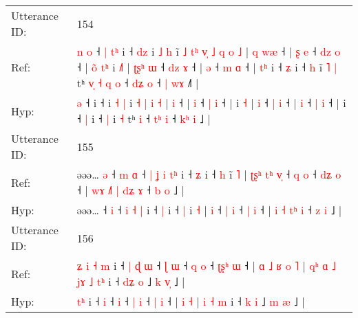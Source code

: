 \documentclass[10pt]{article}
\DeclareRobustCommand{\hl}[1]{{\textcolor{red}{#1}}}
\begin{document}
\begin{longtable}{ll}
 \\
\midrule
Utterance ID: & 154 \\
Ref: & \hl{n}\hl{ }\hl{o} ˧\hl{ }\hl{|}\hl{ }\hl{t}\hl{ʰ} i ˧\hl{ }\hl{d}\hl{z} i \hl{˩} \hl{h} i\hl{̃}\hl{ }\hl{˩}\hl{ }\hl{t}\hl{ʰ}\hl{ }\hl{v}\hl{̩} \hl{˩} \hl{q} \hl{o} \hl{˩} |\hl{ }\hl{q} \hl{w}\hl{æ} ˧ |\hl{ }\hl{ʂ} \hl{e} ˧ \hl{d}\hl{z} \hl{o} ˧ |\hl{ }\hl{o}\hl{̃}\hl{ }\hl{t}\hl{ʰ} i \hl{˩}\hl{˥} |\hl{ }\hl{ʈ}\hl{ʂ}\hl{ʰ} \hl{ɯ} ˧ \hl{d}\hl{z} \hl{ɤ} ˧ | \hl{ə} ˧ \hl{m} \hl{ɑ} ˧ |\hl{ }\hl{t}\hl{ʰ} i ˧ \hl{ʑ} i ˧ \hl{h} i\hl{̃}\hl{ }\hl{˥} \hl{|} tʰ\hl{ }\hl{v}\hl{̩}\hl{ }\hl{˧}\hl{ }\hl{q} \hl{o} ˧ \hl{d}\hl{ʑ} \hl{o} ˧ \hl{|}\hl{ }\hl{w}\hl{ɤ} ˩\hl{˥} |
 \\
Hyp: & \hl{}\hl{}\hl{ə} ˧\hl{}\hl{}\hl{}\hl{}\hl{} i ˧\hl{}\hl{}\hl{} i \hl{˧} \hl{|} i\hl{}\hl{}\hl{}\hl{}\hl{}\hl{}\hl{}\hl{}\hl{} \hl{˧} \hl{|} \hl{i} \hl{˧} |\hl{}\hl{} \hl{}\hl{i} ˧ |\hl{}\hl{} \hl{i} ˧ \hl{}\hl{|} \hl{i} ˧ |\hl{}\hl{}\hl{}\hl{}\hl{}\hl{} i \hl{}\hl{˧} |\hl{}\hl{}\hl{}\hl{} \hl{i} ˧ \hl{}\hl{|} \hl{i} ˧ | \hl{i} ˧ \hl{|} \hl{i} ˧ |\hl{}\hl{}\hl{} i ˧ \hl{|} i ˧ \hl{|} i\hl{}\hl{}\hl{} \hl{˧} tʰ\hl{}\hl{}\hl{}\hl{}\hl{}\hl{}\hl{} \hl{i} ˧ \hl{t}\hl{ʰ} \hl{i} ˧ \hl{k}\hl{ʰ}\hl{ }\hl{i} ˩\hl{} |
 \\
\midrule
Utterance ID: & 155 \\
Ref: & əəə…\hl{ }\hl{ə} ˧\hl{ }\hl{m} \hl{ɑ} ˧\hl{ }\hl{|} \hl{ʝ} \hl{i} \hl{t}\hl{ʰ} i ˧ \hl{ʑ} i ˧ \hl{h} i\hl{̃} \hl{˥} |\hl{ }\hl{ʈ}\hl{ʂ}\hl{ʰ}\hl{ }\hl{t}\hl{ʰ} \hl{v}\hl{̩} ˧ \hl{q} \hl{o} ˧ \hl{d}\hl{ʑ} \hl{o} ˧ |\hl{ }\hl{w}\hl{ɤ} \hl{˩}\hl{˥} \hl{|} \hl{d}\hl{ʑ} \hl{ɤ} ˧ \hl{b} \hl{o} ˩ |
 \\
Hyp: & əəə…\hl{}\hl{} ˧\hl{}\hl{} \hl{i} ˧\hl{}\hl{} \hl{i} \hl{˧} \hl{}\hl{|} i ˧ \hl{|} i ˧ \hl{|} i\hl{} \hl{˧} |\hl{}\hl{}\hl{}\hl{}\hl{}\hl{}\hl{} \hl{}\hl{i} ˧ \hl{|} \hl{i} ˧ \hl{}\hl{|} \hl{i} ˧ |\hl{}\hl{}\hl{} \hl{}\hl{i} \hl{˧} \hl{t}\hl{ʰ} \hl{i} ˧ \hl{z} \hl{i} ˩ |
 \\
\midrule
Utterance ID: & 156 \\
Ref: & \hl{ʑ}\hl{ }\hl{i}\hl{ }\hl{˧}\hl{ }\hl{m} i ˧\hl{ }\hl{|}\hl{ }\hl{ɖ} \hl{ɯ} ˧\hl{ }\hl{ɭ} \hl{ɯ} ˧ \hl{q} \hl{o} ˧ \hl{ʈ}\hl{ʂ}\hl{ʰ} \hl{ɯ} ˧ |\hl{ }\hl{ɑ}\hl{ }\hl{˩}\hl{ }\hl{ʁ} \hl{o} \hl{˥} |\hl{ }\hl{q}\hl{ʰ}\hl{ }\hl{ɑ}\hl{ }\hl{˩} \hl{j}\hl{ɤ} \hl{˩} \hl{t}\hl{ʰ} i ˧ \hl{d}\hl{ʑ} \hl{o} ˩ \hl{k} \hl{v}\hl{̩} ˩ |
 \\
Hyp: & \hl{}\hl{}\hl{}\hl{}\hl{}\hl{t}\hl{ʰ} i ˧\hl{}\hl{}\hl{}\hl{} \hl{i} ˧\hl{}\hl{} \hl{i} ˧ \hl{|} \hl{i} ˧ \hl{}\hl{}\hl{|} \hl{i} ˧ |\hl{}\hl{}\hl{}\hl{}\hl{}\hl{} \hl{i} \hl{˧} |\hl{}\hl{}\hl{}\hl{}\hl{}\hl{}\hl{} \hl{}\hl{i} \hl{˧} \hl{}\hl{m} i ˧ \hl{}\hl{k} \hl{i} ˩ \hl{m} \hl{}\hl{æ} ˩ |

\end{longtable}
\end{document}
